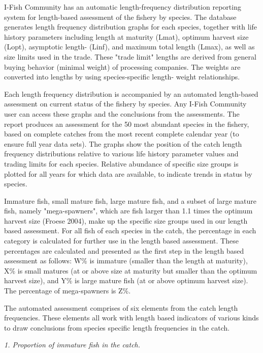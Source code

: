 I-Fish Community has an automatic length-frequency distribution reporting system for length-based assessment of the fishery by species. The database generates length frequency distribution graphs for each species, together with life history parameters including length at maturity (Lmat), optimum harvest size (Lopt), asymptotic length- (Linf), and maximum total length (Lmax), as well as size limits used in the trade. These "trade limit" lengths are derived from general buying behavior (minimal weight) of processing companies. The weights are converted into lengths by using species-specific length- weight relationships.

Each length frequency distribution is accompanied by an automated length-based assessment on current status of the fishery by species. Any I-Fish Community user can access these graphs and the conclusions from the assessments. The report produces an assessment for the 50 most abundant species in the fishery, based on complete catches from the most recent complete calendar year (to ensure full year data sets). The graphs show the position of the catch length frequency distributions relative to various life history parameter values and trading limits for each species. Relative abundance of specific size groups is plotted for all years for which data are available, to indicate trends in status by species.

\clearpage
\newpage

Immature fish, small mature fish, large mature fish, and a subset of large mature fish, namely "mega-spawners", which are fish larger than 1.1 times the optimum harvest size (Froese 2004), make up the specific size groups used in our length based assessment. For all fish of each species in the catch, the percentage in each category is calculated for further use in the length based assessment. These percentages are calculated and presented as the first step in the length based assessment as follows: W\% is immature (smaller than the length at maturity), X\% is small matures (at or above size at maturity but smaller than the optimum harvest size), and Y\% is large mature fish (at or above optimum harvest size). The percentage of mega-spawners is Z\%.

The automated assessment comprises of six elements from the catch length frequencies. These elements all work with length based indicators of various kinds to draw conclusions from species specific length frequencies in the catch.

\textit{1. Proportion of immature fish in the catch.}

